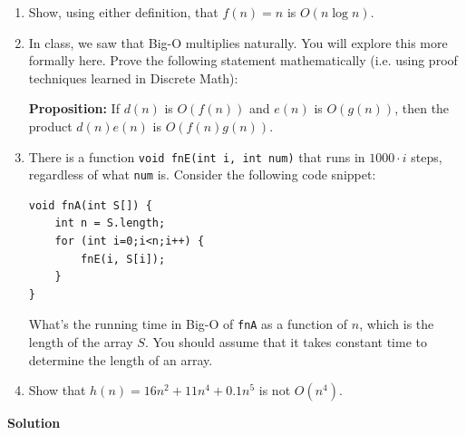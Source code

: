 \documentclass{article}
\newcommand{\solution}{\textbf{\large Solution}}
\theoremstyle{remark}
\begin{document}
\begin{enumerate}
    \item Show, using either definition, that $f(n) = n$ is $O(n \log n)$.
    \item In class, we saw that Big-O multiplies naturally. You will explore this more formally here. Prove the following statement mathematically (i.e. using proof techniques learned in Discrete Math):

    \textbf{Proposition:} If $d(n)$ is $O(f(n))$ and $e(n)$ is $O(g(n))$, then the product $d(n)e(n)$ is $O(f(n)g(n))$.

    \item There is a function \texttt{void fnE(int i, int num)} that runs in $1000\cdot i$ steps, regardless of what \texttt{num} is. Consider the following code snippet:

\begin{verbatim}
void fnA(int S[]) {
    int n = S.length;
    for (int i=0;i<n;i++) {
        fnE(i, S[i]);
    }
}
\end{verbatim}

What’s the running time in Big-O of \texttt{fnA} as a function of $n$, which is the length of the array $S$. You should assume that it takes constant time to determine the length of an array.

    \item Show that $h(n) = 16n^2 + 11n^4 + 0.1n^5$ is not $O(n^4)$.
\end{enumerate}

\medskip
\solution
\end{document}
